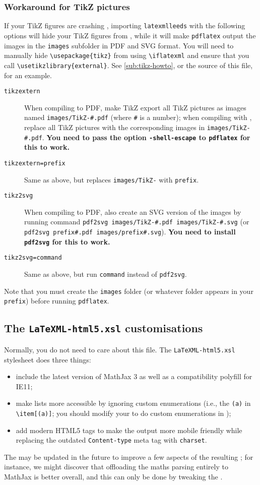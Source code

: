 \documentclass[a4paper]{article}
\def\ltxinline{\lstinline[style=latexml]}
\theoremstyle{definition}
\begin{document}
\subsubsection{Workaround for TikZ pictures}
\label{ssub:TikZ}
If your TikZ figures are crashing \LaTeXML{}, importing \verb|latexmlleeds| with the following options will hide your TikZ figures from \LaTeXML{}, while it will make \verb|pdflatex| output the images in the \verb|images| subfolder in PDF and SVG format. You will need to manually hide \ltxinline|\usepackage{tikz}| from \LaTeXML{} using \ltxinline|\iflatexml| and ensure that you call \ltxinline|\usetikzlibrary{external}|. See \autoref{sub:tikz-howto}, or the source of this file, for an example.
\begin{description}
  \item[\texttt{tikzextern}] When compiling to PDF, make TikZ export all TikZ pictures as images named \verb|images/TikZ-#.pdf| (where \verb|#| is a number); when compiling with \LaTeXML{}, replace all TikZ pictures with the corresponding images in \verb|images/TikZ-#.pdf|. \textbf{You need to pass the option \texttt{-shell-escape} to \texttt{pdflatex} for this to work.}
  \item[\texttt{tikzextern=prefix}] Same as above, but replaces \verb|images/TikZ-| with \verb|prefix|.
  \item[\texttt{tikz2svg}] When compiling to PDF, also create an SVG version of the images by running command \verb|pdf2svg images/TikZ-#.pdf images/TikZ-#.svg| (or \verb|pdf2svg prefix#.pdf images/prefix#.svg|). \textbf{You need to install \texttt{pdf2svg} for this to work.}
  \item[\texttt{tikz2svg=command}] Same as above, but run \verb|command| instead of \verb|pdf2svg|.
\end{description}
Note that you must create the \verb|images| folder (or whatever folder appears in your \verb|prefix|) before running \verb|pdflatex|.

\subsection{The \texttt{LaTeXML-html5.xsl} customisations}
\label{sub:xslt}
Normally, you do not need to care about this file. The \verb|LaTeXML-html5.xsl| \XSLT{} stylesheet does three things:
\begin{itemize}
  \item include the latest version of MathJax 3 as well as a compatibility polyfill for IE11;
  \item make \HTML{} lists more accessible by ignoring custom enumerations (i.e., the \ltxinline|(a)| in \ltxinline|\item[(a)]|; you should modify your \CSS{} to do custom enumerations in \HTML{});
  \item add modern HTML5 tags to make the output more mobile friendly while replacing the outdated \verb|Content-type| meta tag with \verb|charset|.
\end{itemize}
The \XSLT{} may be updated in the future to improve a few aspects of the resulting \HTML{}; for instance, we might discover that offloading the maths parsing entirely to MathJax is better overall, and this can only be done by tweaking the \XSLT{}.
\end{document}
